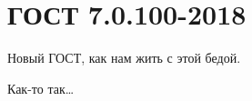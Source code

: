 \chapter{ГОСТ 7.0.100-2018}

Новый ГОСТ, как нам жить с этой бедой.

\begin{otherlanguage}{english}
\lipsum[1-99]
\end{otherlanguage}

Как-то так\dots